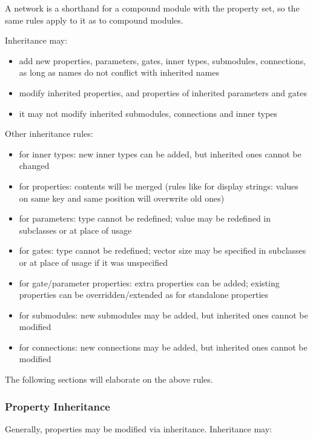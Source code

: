 A network is a shorthand for a compound module with the 
property set, so the same rules apply to it as to compound modules.

Inheritance may:
\begin{itemize}
    \item add new properties, parameters, gates, inner types, submodules,
          connections, as long as names do not conflict with inherited names
    \item modify inherited properties, and properties of inherited parameters and
          gates
    \item it may not modify inherited submodules, connections and inner types
\end{itemize}

Other inheritance rules:
\begin{itemize}
    \item  for inner types:
       new inner types can be added, but inherited ones cannot be changed
    \item  for properties:
       contents will be merged (rules like for display strings: values on
       same key and same position will overwrite old ones)
    \item for parameters:
       type cannot be redefined;
       value may be redefined in subclasses or at place of usage
    \item  for gates:
       type cannot be redefined;
       vector size may be specified in subclasses or at place of usage if it was unspecified
    \item  for gate/parameter properties:
       extra properties can be added;
       existing properties can be overridden/extended as for standalone properties
    \item  for submodules:
       new submodules may be added, but inherited ones cannot be modified
    \item  for connections:
       new connections may be added, but inherited ones cannot be modified
\end{itemize}

The following sections will elaborate on the above rules.

\subsubsection{Property Inheritance}
\label{sec:ned-ref:property-inheritance}

Generally, properties may be modified via inheritance. Inheritance may:

